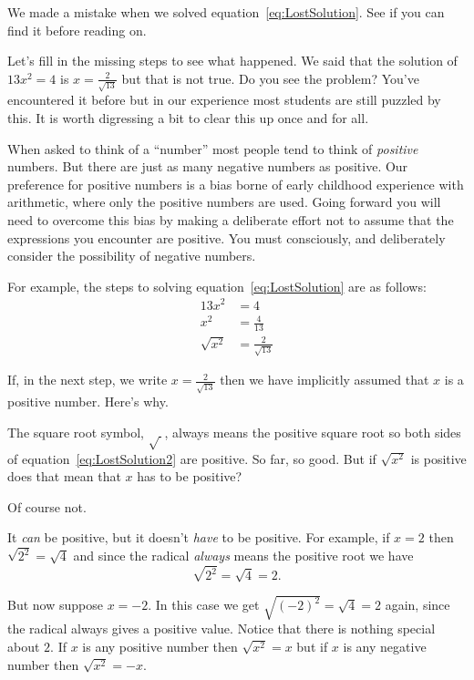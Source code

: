 \begin{myexample}
  We made a mistake when we solved equation~\ref{eq:LostSolution}. See
  if you can find it before reading on.

  \begin{Digression}

    Let's fill in the missing steps to see what happened. We said that
    the solution of $13x^2= 4$ is $x=\frac{2}{\sqrt{13}}$ but that is
    not true.  Do you see the problem?  You've encountered it before
    but in our experience most students are still puzzled by this. It
    is worth digressing a bit to clear this up once and for all.

    When asked to think of a ``number'' most people tend to think of
    \emph{positive} numbers. But there are just as many negative
    numbers as positive. Our preference for positive numbers is a bias
    borne of early childhood experience with arithmetic, where only
    the positive numbers are used.  Going forward you will need to
    overcome this bias by making a deliberate effort not to assume
    that the expressions you encounter are positive. You must
    consciously, and deliberately consider the possibility of negative
    numbers.

    For example, the steps to solving equation~\ref{eq:LostSolution}
    are as follows:
    \begin{align}
      \nonumber    13x^2&=4\\
      \nonumber    x^2&=\frac{4}{13}\\
      \label{eq:LostSolution2}    \sqrt{x^2}&=\frac{2}{\sqrt{13}}
    \end{align}

    If, in the next step, we write $x=\frac{2}{\sqrt{13}}$ then
    we have
    implicitly assumed that $x$ is a positive number.  Here's why.

    The square root symbol, $\sqrt{\ }$, \alert{always} means the
    \alert{positive} square root so both sides of
    equation~\ref{eq:LostSolution2} are positive. So far, so good. But
    if $\sqrt{x^2}$ is positive does that mean that $x$ has to be
    positive?

    Of course not.

    It \emph{can} be positive, but it doesn't \emph{have} to be
    positive. For example, if $x=2$ then $\sqrt{2^2}=\sqrt{4}$ and
    since the radical \emph{always} means the positive root we
    have $$\sqrt{2^2}=\sqrt{4}=2.$$

    But now suppose $x=-2$. In this case we get
    $ \sqrt{(-2)^2}=\sqrt{4}=2$ again, since the radical always gives
    a positive value. Notice that there is nothing special about
    $2$. If $x$ is any positive number then $\sqrt{x^2} = x$ but if
    $x$ is any negative number then $\sqrt{x^2}=-x$.


\end{Digression}
\end{myexample}
